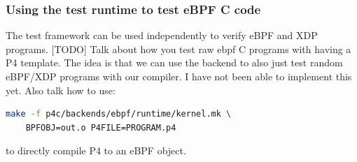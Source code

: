 \subsubsection{Using the test runtime to test eBPF C code}
The test framework can be used independently to verify eBPF and XDP programs. 
[TODO] Talk about how you test raw ebpf C programs with having a P4 template. 
The idea is that we can use the backend to also just test random eBPF/XDP 
programs with our compiler. I have not been able to implement this yet.
Also talk how to use:
\begin{lstlisting}[language=bash]
make -f p4c/backends/ebpf/runtime/kernel.mk \
	BPFOBJ=out.o P4FILE=PROGRAM.p4
\end{lstlisting}
to directly compile P4 to an eBPF object.

